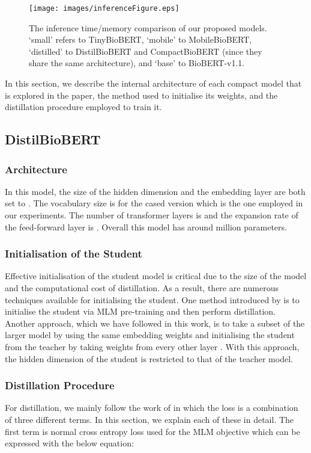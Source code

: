 \documentclass{article}
\begin{document}
\begin{figure*}[ht!]
\centering
\label{fig:efficieny}
\texttt{[image: images/inferenceFigure.eps]}
\caption{The inference time/memory comparison of our proposed models. `small' refers to TinyBioBERT, `mobile' to MobileBioBERT, `distilled' to DistilBioBERT and CompactBioBERT (since they share the same architecture), and `base' to BioBERT-v1.1.}
\end{figure*}

In this section, we describe the internal architecture of each compact model that is explored in the paper, the method used to initialise its weights, and the distillation procedure employed to train it.  



\subsection{DistilBioBERT}
\label{distilbiobert}

\subsubsection{Architecture}
In this model, the size of the hidden dimension and the embedding layer are both set to . The vocabulary size is  for the cased version which is the one employed in our experiments. The number of transformer layers is  and the expansion rate of the feed-forward layer is . Overall this model has around  million parameters.

\subsubsection{Initialisation of the Student}
Effective initialisation of the student model is critical due to the size of the model and the computational cost of distillation.
As a result, there are numerous techniques available for initialising the student. One method introduced by \citet{distillation_google} is to initialise the student via MLM pre-training and then perform distillation. Another approach, which we have followed in this work, is to take a subset of the larger model by using the same embedding weights and initialising the student from the teacher by taking weights from every other layer \citep{sanh2019distilbert}. With this approach, the hidden dimension of the student is restricted to that of the teacher model.  

\subsubsection{Distillation Procedure}
For distillation, we mainly follow the work of \citet{sanh2019distilbert} in which the loss is a combination of three different terms. In this section, we explain each of these in detail. The first term is normal cross entropy loss used for the MLM objective which can be expressed with the below equation:
\end{document}
